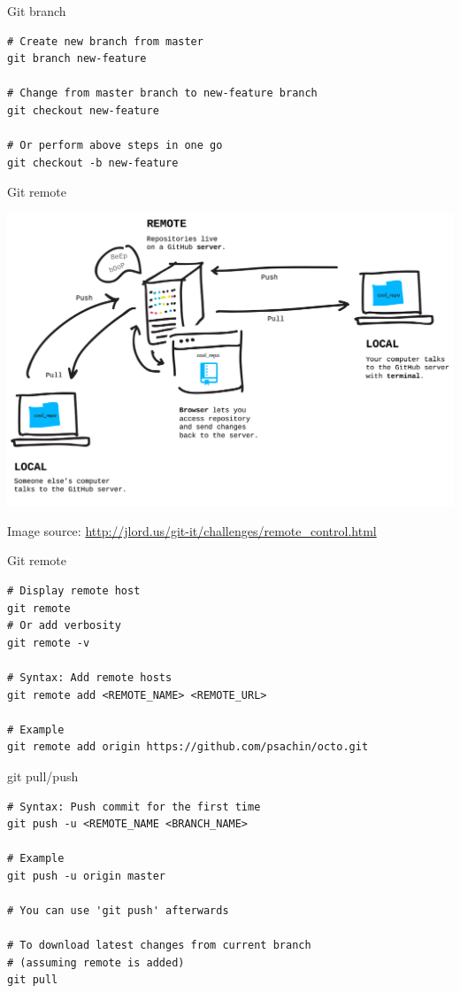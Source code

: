 \documentclass[10pt]{beamer}
\begin{document}
\begin{frame}[fragile,label={sec:org13ed12a}]{Git branch}
 \begin{verbatim}
# Create new branch from master
git branch new-feature

# Change from master branch to new-feature branch
git checkout new-feature

# Or perform above steps in one go
git checkout -b new-feature
\end{verbatim}
\end{frame}

\begin{frame}[label={sec:org564f49c}]{Git remote}
\begin{center}
\includegraphics[width=.9\linewidth]{./remotes.png}
\end{center}

Image source: \url{http://jlord.us/git-it/challenges/remote\_control.html}
\end{frame}

\begin{frame}[fragile,label={sec:orgdc68973}]{Git remote}
 \begin{verbatim}
# Display remote host
git remote
# Or add verbosity
git remote -v

# Syntax: Add remote hosts
git remote add <REMOTE_NAME> <REMOTE_URL>

# Example
git remote add origin https://github.com/psachin/octo.git
\end{verbatim}
\end{frame}

\begin{frame}[fragile,label={sec:org2b4a83e}]{git pull/push}
 \begin{verbatim}
# Syntax: Push commit for the first time
git push -u <REMOTE_NAME <BRANCH_NAME>

# Example
git push -u origin master

# You can use 'git push' afterwards

# To download latest changes from current branch
# (assuming remote is added)
git pull
\end{verbatim}
\end{frame}
\end{document}

